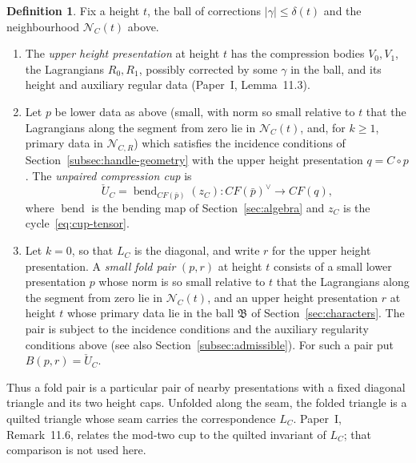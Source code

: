 \documentclass[11pt]{amsart}
\theoremstyle{definition}
\newtheorem{definition}[theorem]{Definition}
\theoremstyle{remark}
\theoremstyle{plain}
\numberwithin{equation}{section}
\newcommand{\CF}{\mathit{CF}}
\begin{document}
\begin{definition}\label{def:fold-pair}
Fix a height $t$, the ball of corrections $|\gamma|\le\delta(t)$ and
the neighbourhood $\mathcal N_C(t)$ above.
\begin{enumerate}[label=(\alph*)]
\item The \emph{upper height presentation} at height $t$ has the
compression bodies $V_0,V_1$, the Lagrangians $R_0,R_1$, possibly
corrected by some $\gamma$ in the ball, and its height and auxiliary
regular data (Paper~I, Lemma~11.3).
\item Let $p$ be lower data as above (small, with norm so small relative to $t$ that the Lagrangians along the segment from zero lie in $\mathcal N_C(t)$, and, for $k\ge1$, primary data in $\mathcal N_{C,R}$) which satisfies the incidence conditions of Section~\ref{subsec:handle-geometry} with
the upper height presentation $q=C\circ p$. The \emph{unpaired
compression cup} is
\begin{equation}\label{eq:check-cup}
 \check U_C=\operatorname{bend}_{\CF(\bar p)}(z_C):
       \CF(\bar p)^\vee\longrightarrow\CF(q),
\end{equation}
where $\operatorname{bend}$ is the bending map of
Section~\ref{sec:algebra} and $z_C$ is the cycle~\eqref{eq:cup-tensor}.
\item Let $k=0$, so that $L_C$ is the diagonal, and write $r$ for the
upper height presentation. A \emph{small fold pair} $(p,r)$ at
height $t$ consists of a small lower presentation $p$ whose norm is so small relative to $t$
that the Lagrangians along the segment from zero lie in $\mathcal N_C(t)$, and an upper height
presentation $r$
at height $t$ whose primary data lie in the ball $\mathfrak B$ of
Section~\ref{sec:characters}. The pair is subject to the incidence
conditions and the auxiliary regularity conditions above (see also
Section~\ref{subsec:admissible}). For such a pair put
$B(p,r)=\check U_C$.
\end{enumerate}
\end{definition}

Thus a fold pair is a particular pair of nearby presentations with a
fixed diagonal triangle and its two height caps. Unfolded along the
seam, the folded triangle is a quilted triangle whose seam carries
the correspondence $L_C$. Paper~I, Remark~11.6, relates the mod-two
cup to the quilted invariant of $L_C$; that comparison is not used
here.
\end{document}
